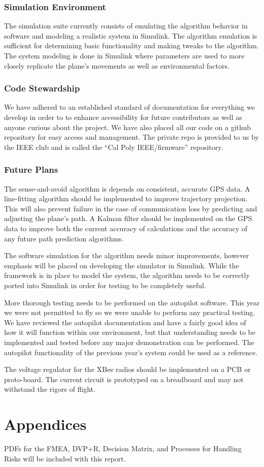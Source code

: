 \documentclass[12pt]{article}
\begin{document}
\subsubsection{Simulation Environment}
The simulation suite currently consists of emulating the algorithm behavior in software and modeling a realistic system in Simulink. The algorithm emulation is sufficient for determining basic functionality and making tweaks to the algorithm. The system modeling is done in Simulink where parameters are used to more closely replicate the plane's movements as well as environmental factors.

\subsubsection{Code Stewardship}
We have adhered to an established standard of documentation for everything we develop in order to to enhance accessibility for future contributors as well as anyone curious about the project.  We have also placed all our code on a github repository for easy access and management. The private repo is provided to us by the IEEE club and is called the “Cal Poly IEEE/firmware” repository.

\subsubsection{Future Plans}
The sense-and-avoid algorithm is depends on consistent, accurate GPS data. A line-fitting algorithm should be implemented to improve trajectory projection. This will also prevent failure in the case of communication loss by predicting and adjusting the plane's path. A Kalman filter should be implemented on the GPS data to improve both the current accuracy of calculations and the accuracy of any future path prediction algorithms.

The software simulation for the algorithm needs minor improvements, however emphasis will be placed on developing the simulator in Simulink. While the framework is in place to model the system, the algorithm needs to be correctly ported into Simulink in order for testing to be completely useful.

More thorough testing needs to be performed on the autopilot software. This year we were not permitted to fly so we were unable to perform any practical testing. We have reviewed the autopilot documentation and have a fairly good idea of how it will function within our environment, but that understanding needs to be implemented and tested before any major demonstration can be performed. The autopilot functionality of the previous year's system could be used as a reference.

The voltage regulator for the XBee radios should be implemented on a PCB or proto-board. The current circuit is prototyped on a breadboard and may not withstand the rigors of flight.

\section{Appendices}
PDFs for the FMEA, DVP+R, Decision Matrix, and Processes for Handling Risks will be included with this report.
\end{document}
